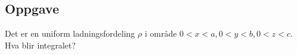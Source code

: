   \subsection*{Oppgave}
    Det er en uniform ladningsfordeling $ ρ $ i område $ 0<x<a, 0<y<b, 0<z<c $. Hva blir integralet? \newline 

  





